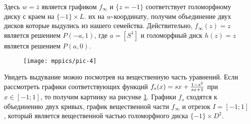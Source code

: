 Здесь $w = \bar z$ является графиком $f_\infty$ и $\{z = -1\}$ соответствует голоморфному диску с краем на $\{-1\} \times L$.
 их на $w$-координату, получим объединение двух дисков которые выдулись из нашего семейства.
Действительно, $f_\infty (z) = z$ является решением $P (-a, 1)$, где $a = [S^1]$ и голоморфный диск $h (z) = z$ является решением $P (a, 0)$.

\begin{figure}[ht!]
\vskip-0mm
\centering
\texttt{[image: mppics/pic-4]}
\caption{}\label{pic-4}
\vskip0mm
\end{figure}

Увидеть выдувание можно посмотрев на вещественную часть уравнений.
Если рассмотреть графики соответствующих функций
$f_s(x)\z=sx+\frac{1-s^2}{sx+1}$ при $x \in [-1;1]$, 
то получим картинку на рисунке \ref{pic-4}. 
Графики $f_s$ сходятся к объединению двух кривых, график вещественной
части $f_\infty$ и отрезок $I = [-1;1]$, который является
вещественной частью голоморфного диска $\{-1\} \times D^2$.  
